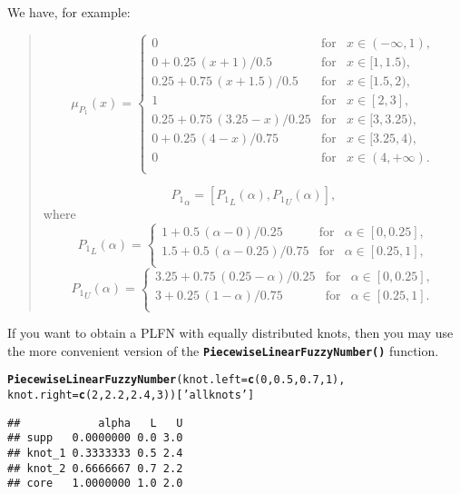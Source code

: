 \documentclass[11pt]{article}\usepackage[]{graphicx}\usepackage[]{color}
\makeatletter
\newcommand{\hlnum}[1]{\textcolor[rgb]{0.686,0.059,0.569}{#1}}%
\newcommand{\hlstr}[1]{\textcolor[rgb]{0.192,0.494,0.8}{#1}}%
\newcommand{\hlstd}[1]{\textcolor[rgb]{0.345,0.345,0.345}{#1}}%
\newcommand{\hlkwc}[1]{\textcolor[rgb]{0.333,0.667,0.333}{#1}}%
\newcommand{\hlkwd}[1]{\textcolor[rgb]{0.737,0.353,0.396}{\textbf{#1}}}%
\newenvironment{kframe}{%
 \def\at@end@of@kframe{}%
 \ifinner\ifhmode%
  \def\at@end@of@kframe{\end{minipage}}%
  \begin{minipage}{\columnwidth}%
 \fi\fi%
 \def\FrameCommand##1{\hskip\@totalleftmargin \hskip-\fboxsep
 \colorbox{shadecolor}{##1}\hskip-\fboxsep
     \hskip-\linewidth \hskip-\@totalleftmargin \hskip\columnwidth}%
 \MakeFramed {\advance\hsize-\width
   \@totalleftmargin\z@ \linewidth\hsize
   \@setminipage}}%
 {\par\unskip\endMakeFramed%
 \at@end@of@kframe}
\newenvironment{knitrout}{}{} %
\newcommand{\func}[1]{\texttt{\hlkwd{#1}}}
\makeatother
\begin{document}
We have, for example:
\begin{quote}
\[
\mu_{P_1}(x) = \left\{
\begin{array}{lll}
0      & \text{for} & x\in(-\infty,1), \\
0+0.25\,(x+1)/0.5 & \text{for} & x\in[1,1.5), \\
0.25+0.75\,(x+1.5)/0.5 & \text{for} & x\in[1.5,2), \\
1      & \text{for} & x\in[2,3], \\
0.25+0.75\,(3.25-x)/0.25 & \text{for} & x\in[3,3.25), \\
0+0.25\,(4-x)/0.75 & \text{for} & x\in[3.25,4), \\
0      & \text{for} & x\in(4,+\infty). \\
\end{array}
\right.
\]

\[
{P_1}_\alpha = [{P_1}_L(\alpha), {P_1}_U(\alpha)],
\]
where
\[
{P_1}_L(\alpha) = \left\{
\begin{array}{lll}
1+0.5\,(\alpha-0)/0.25 & \text{for} & \alpha\in[0,0.25], \\
1.5+0.5\,(\alpha-0.25)/0.75 & \text{for} & \alpha\in[0.25,1], \\
\end{array}
\right.
\]
\[
{P_1}_U(\alpha) = \left\{
\begin{array}{lll}
3.25+0.75\,(0.25-\alpha)/0.25 & \text{for} & \alpha\in[0,0.25], \\
3+0.25\,(1-\alpha)/0.75 & \text{for} & \alpha\in[0.25,1]. \\
\end{array}
\right.
\]
\end{quote}

\bigskip
If you want to obtain a PLFN with equally distributed knots, then
you may use the more convenient version of
the \func{PiecewiseLinearFuzzyNumber()} function.

\begin{knitrout}\small
{}\color{fgcolor}\begin{kframe}
\begin{alltt}
\hlkwd{PiecewiseLinearFuzzyNumber}\hlstd{(}\hlkwc{knot.left}\hlstd{=}\hlkwd{c}\hlstd{(}\hlnum{0}\hlstd{,}\hlnum{0.5}\hlstd{,}\hlnum{0.7}\hlstd{,}\hlnum{1}\hlstd{),}
                           \hlkwc{knot.right}\hlstd{=}\hlkwd{c}\hlstd{(}\hlnum{2}\hlstd{,}\hlnum{2.2}\hlstd{,}\hlnum{2.4}\hlstd{,}\hlnum{3}\hlstd{))[}\hlstr{'allknots'}\hlstd{]}
\end{alltt}
\begin{verbatim}
##            alpha   L   U
## supp   0.0000000 0.0 3.0
## knot_1 0.3333333 0.5 2.4
## knot_2 0.6666667 0.7 2.2
## core   1.0000000 1.0 2.0
\end{verbatim}
\end{kframe}
\end{knitrout}
\end{document}
